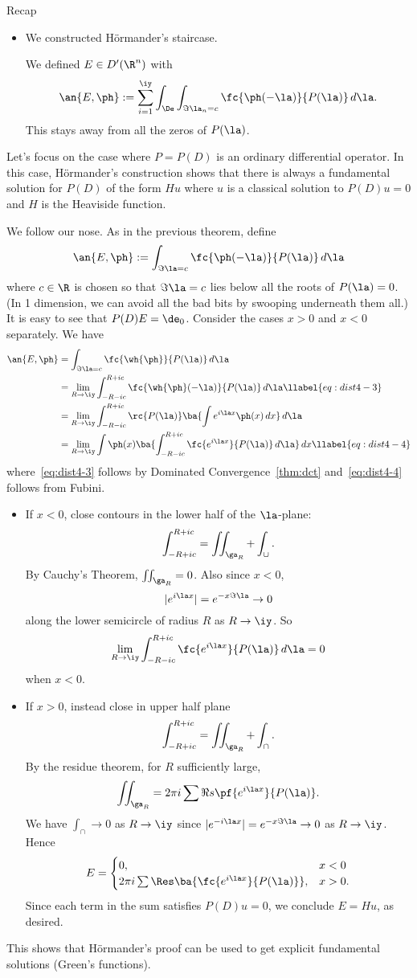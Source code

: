 Recap 
\begin{itemize}
\item
We constructed H\"ormander's staircase.

We defined $E\in D'(\R^n)$ with
\[
\an{E,\ph}:=\sum_{i=1}^{\iy} \int_{\De}\int_{\Im \la_n=c}\fc{\ph(-\la)}{P(\la)}\,d\la.
\]
This stays away from all the zeros of $P(\la)$. 
\end{itemize}

Let's focus on the case where $P=P(D)$ is an ordinary differential operator. In this case, H\"ormander's construction shows that there is always a fundamental solution for $P(D)$ of the form $Hu$ where $u$ is a classical solution to $P(D)u=0$ and $H$ is the Heaviside function.

We follow our nose. As in the previous theorem, define 
\[\an{E,\ph}:=
\int_{\Im\la=c} \fc{\ph(-\la)}{P(\la)} \,d\la
\]
where $c\in \R$ is chosen so that $\Im\la=c$ lies below all the roots of $P(\la)=0$. (In 1 dimension, we can avoid all the bad bits by swooping underneath them all.) It is easy to see that $P(D)E=\de_0$. Consider the cases $x>0$ and $x<0$ separately. We have
\begin{align}
\an{E,\ph}&=\int_{\Im \la=c} 
\fc{\wh{\ph}}{P(\la)}\,d\la\\
&=\lim_{R\to \iy} \int_{-R-ic}^{R+ic} \fc{\wh{\ph}(-\la)}{P(\la)}\,d\la
\llabel{eq:dist4-3}
\\
&=\lim_{R\to \iy}\int_{-R-ic}^{R+ic} \rc{P(\la)}\ba{
\int e^{i\la x}\ph(x)\,dx
}\,d\la\\
&=\lim_{R\to \iy}\int \ph(x)\ba{
\int_{-R-ic}^{R+ic} \fc{e^{i\la x}}{P(\la)}\,d\la
}\,dx
\llabel{eq:dist4-4}
\end{align}
where~\eqref{eq:dist4-3} follows by Dominated Convergence~\ref{thm:dct} and~\eqref{eq:dist4-4} follows from Fubini.
\begin{itemize}
\item
If $x<0$, close contours in the lower half of the $\la$-plane:
\[
\int_{-R+ic}^{R+ic}=\iint_{\ga_R}+\int_{\cup}.
\]
By Cauchy's Theorem, $\iint_{\ga_R}=0$. Also since $x<0$, 
\[
|e^{i\la x}|=e^{-x\Im \la}\to 0
\]
along the lower semicircle of radius $R$ as $R\to \iy$.
So 
\[
\lim_{R\to \iy}\int_{-R-ic}^{R+ic}\fc{e^{i\la x}}{P(\la)}\,d\la=0
\]
when $x<0$.
\item
If $x>0$, instead close in upper half plane 
\[
\int_{-R+ic}^{R+ic}=\iint_{\ga_R}+\int_{\cap}.
\]
By the residue theorem, for $R$ sufficiently large, 
\[
\iint_{\ga_R}=2\pi i\sum \Re s\pf{e^{i\la x}}{P(\la)}.
\]
We have $\int_{\cap}\to 0$ as $R\to \iy$ since $|e^{-i\la x}|=e^{-x\Im \la}\to 0$ as $R\to \iy$. Hence
\[
E=\begin{cases}
0,&x<0\\
2\pi i \sum \Res\ba{\fc{e^{i\la x}}{P(\la)}},&x>0.
\end{cases}
\]
Since each term in the sum satisfies $P(D)u=0$, we conclude $E=Hu$, as desired.
\end{itemize}
This shows that H\"ormander's proof can be used to get explicit fundamental solutions (Green's functions).

